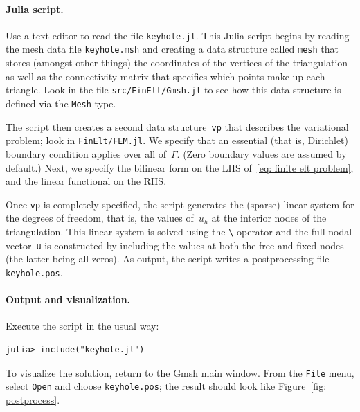\documentclass[a4paper,12pt]{article}
\begin{document}
\paragraph{Julia script.}
Use a text editor to read the file \verb!keyhole.jl!.  This 
Julia script begins by reading the mesh data file \verb!keyhole.msh! 
and creating a data structure called \verb!mesh! that stores (amongst 
other things) the coordinates of the vertices of the triangulation as 
well as the connectivity matrix that specifies which points make up 
each triangle.  Look in the file
\verb!src/FinElt/Gmsh.jl! to see how this data structure is defined via 
the \verb!Mesh! type.  

The script then creates a second data structure~\verb!vp! that 
describes the variational problem; look in \verb!FinElt/FEM.jl!.  We 
specify that an essential (that is, Dirichlet) boundary condition 
applies over all of~$\Gamma$.  (Zero boundary values are assumed by 
default.)  Next, we specify the bilinear form on the LHS 
of~\eqref{eq: finite elt problem}, and the linear functional on the 
RHS.

Once \verb!vp! is completely specified, the script generates the 
(sparse) linear system for the degrees of freedom, that is, the 
values of~$u_h$ at the interior nodes of the triangulation.  This 
linear system is solved using the \verb!\! operator and the full 
nodal vector~\verb!u! is constructed by including the values at both 
the free and fixed nodes (the latter being all zeros).  As output, 
the script writes a postprocessing file \verb!keyhole.pos!.

\paragraph{Output and visualization.}
Execute the script in the usual way:
\begin{verbatim}
julia> include("keyhole.jl")
\end{verbatim}
To visualize the solution, return to the Gmsh main window.  From 
the \verb!File! menu, select \verb!Open! and choose 
\verb!keyhole.pos!; the result should look like 
Figure~\ref{fig: postprocess}.  
\end{document}
